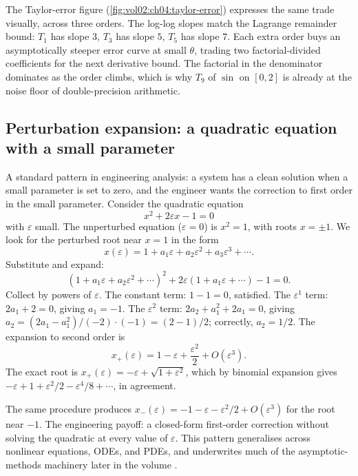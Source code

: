 

The Taylor-error figure (\autoref{fig:vol02:ch04:taylor-error})
expresses the same trade visually, across three orders. The
log-log slopes match the Lagrange remainder bound: $T_{1}$ has slope
$3$, $T_{3}$ has slope $5$, $T_{5}$ has slope $7$. Each extra order
buys an asymptotically steeper error curve at small $\theta$,
trading two factorial-divided coefficients for the next derivative
bound. The factorial in the denominator dominates as the order
climbs, which is why $T_{9}$ of $\sin$ on $[0, 2]$ is already at
the noise floor of double-precision arithmetic.

\subsection{Perturbation expansion: a quadratic equation with a small parameter}

A standard pattern in engineering analysis: a system has a clean
solution when a small parameter is set to zero, and the engineer wants
the correction to first order in the small parameter. Consider the
quadratic equation
\[
x^{2} + 2 \varepsilon x - 1 = 0
\]
with $\varepsilon$ small. The unperturbed equation ($\varepsilon = 0$)
is $x^{2} = 1$, with roots $x = \pm 1$. We look for the perturbed root
near $x = 1$ in the form
\[
x(\varepsilon) = 1 + a_{1} \varepsilon + a_{2} \varepsilon^{2}
+ a_{3} \varepsilon^{3} + \cdots.
\]
Substitute and expand:
\[
(1 + a_{1} \varepsilon + a_{2} \varepsilon^{2} + \cdots)^{2}
+ 2 \varepsilon (1 + a_{1} \varepsilon + \cdots) - 1 = 0.
\]
Collect by powers of $\varepsilon$. The constant term: $1 - 1 = 0$,
satisfied. The $\varepsilon^{1}$ term: $2 a_{1} + 2 = 0$, giving $a_{1}
= -1$. The $\varepsilon^{2}$ term: $2 a_{2} + a_{1}^{2} + 2 a_{1} = 0$,
giving $a_{2} = (2 a_{1} - a_{1}^{2})/(-2) \cdot (-1) = (2 - 1)/2$;
correctly, $a_{2} = 1/2$. The expansion to second order is
\[
x_{+}(\varepsilon) = 1 - \varepsilon + \frac{\varepsilon^{2}}{2} +
O(\varepsilon^{3}).
\]
The exact root is $x_{+}(\varepsilon) = -\varepsilon + \sqrt{1 +
\varepsilon^{2}}$, which by binomial expansion gives $-\varepsilon + 1
+ \varepsilon^{2}/2 - \varepsilon^{4}/8 + \cdots$, in agreement.

The same procedure produces $x_{-}(\varepsilon) = -1 - \varepsilon -
\varepsilon^{2}/2 + O(\varepsilon^{3})$ for the root near $-1$. The
engineering payoff: a closed-form first-order correction without
solving the quadratic at every value of $\varepsilon$. This pattern
generalises across nonlinear equations, ODEs, and PDEs, and underwrites
much of the asymptotic-methods machinery later in the volume
\cite{text:mahajan2014}.

